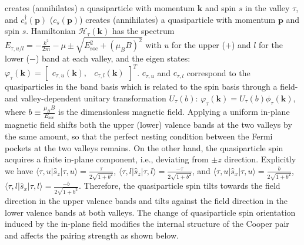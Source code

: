 creates (annihilates) a quasiparticle with momentum $\mathbf{k}$
and spin $s$ in the valley $\tau$, and $c_{s}^{\dagger}(\mathbf{p})$
($c_{s}(\mathbf{p})$) creates (annihilates) a quasiparticle with
momentum $\mathbf{p}$ and spin $s$. Hamiltonian $\mathcal{H}_{\tau}(\mathbf{k})$
has the spectrum $E_{\tau,u/l}=-\frac{k^{2}}{2m}-\mu\pm\sqrt{E_{\text{soc}}^{2}+\left(\mu_{B}B\right)^{2}}$
with $u$ for the upper ($+$) and $l$ for the lower ($-$) band
at each valley, and the eigen states: $\varphi_{\tau}(\mathbf{k})=\left[\begin{array}{cc}
c_{\tau,u}(\mathbf{k}), & c_{\tau,l}(\mathbf{k})\end{array}\right]^{T}$. $c_{\tau,u}$ and $c_{\tau,l}$ correspond to the quasiparticles
in the band basis which is related to the spin basis through a field-
and valley-dependent unitary transformation $U_{\tau}(b)$: $\varphi_{\tau}(\mathbf{k})=U_{\tau}(b)\phi_{\tau}(\mathbf{k})$,
where $b\equiv\frac{\mu_{B}B}{E_{\text{soc}}}$ is the dimensionless magnetic
field. Applying a uniform in-plane magnetic field shifts both the
upper (lower) valence bands at the two valleys
by the same amount, so that the perfect nesting condition between
the Fermi pockets at the two valleys remains. On the other hand, the
quasiparticle spin acquires a finite in-plane component, i.e., deviating
from $\pm z$ direction. Explicitly we have $\langle\tau,u\left|\hat{s}_{z}\right|\tau,u\rangle=\frac{\tau}{2\sqrt{1+b^{2}}}$,
$\langle\tau,l\left|\hat{s}_{z}\right|\tau,l\rangle=\frac{-\tau}{2\sqrt{1+b^{2}}}$,
and $\langle\tau,u\left|\hat{s}_{x}\right|\tau,u\rangle=\frac{b}{2\sqrt{1+b^{2}}}$,
$\langle\tau,l\left|\hat{s}_{x}\right|\tau,l\rangle=\frac{-b}{2\sqrt{1+b^{2}}}$.
Therefore, the quasiparticle spin tilts towards the field direction
in the upper valence bands and tilts against the field direction in
the lower valence bands at both valleys. The change of quasiparticle
spin orientation induced by the in-plane field modifies the internal
structure of the Cooper pair and affects the pairing strength as shown
below.

